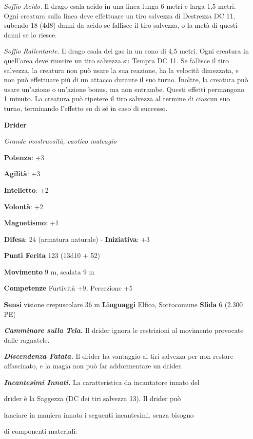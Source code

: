 \begin{multicols}{2}
\emph{Soffio Acido.} Il drago esala acido in una linea lunga 6 metri e
larga 1,5 metri. Ogni creatura sulla linea deve effettuare un tiro
salvezza di Destrezza DC 11, subendo 18 (4d8) danni da acido se fallisce
il tiro salvezza, o la metà di questi danni se lo riesce.

\emph{Soffio Rallentante.} Il drago esala del gas in un cono di 4,5
metri. Ogni creatura in quell'area deve riuscire un tiro salvezza su Tempra DC 11. Se fallisce il tiro salvezza, la creatura non può
usare la sua reazione, ha la velocità dimezzata, e non può effettuare
più di un attacco durante il suo turno. Inoltre, la creatura può usare
un'azione o un'azione bonus, ma non entrambe. Questi effetti permangono
1 minuto. La creatura può ripetere il tiro salvezza al termine di
ciascun suo turno, terminando l'effetto su di sé in caso di successo.



\textbf{Drider}

\emph{Grande mostruosità, caotico malvagio}

\textbf{Potenza}: +3

\textbf{Agilità}: +3

\textbf{Intelletto}: +2

\textbf{Volontà}: +2

\textbf{Magnetismo}: +1

\textbf{Difesa}: 24 (armatura naturale) - \textbf{Iniziativa}: +3

\textbf{Punti Ferita} 123 (13d10 + 52)

\textbf{Movimento} 9 m, scalata 9 m

\textbf{Competenze} Furtività +9, Percezione +5

\textbf{Sensi} visione crepuscolare 36 m
\textbf{Linguaggi} Elfico, Sottocomune \textbf{Sfida} 6 (2.300 PE)\smallskip

\emph{\textbf{Camminare sulla Tela.}} Il drider ignora le restrizioni al
movimento provocate dalle ragnatele.

\emph{\textbf{Discendenza Fatata.}} Il drider ha vantaggio ai tiri
salvezza per non restare affascinato, e la magia non può far
addormentare un drider.

\emph{\textbf{Incantesimi Innati.}} La caratteristica da incantatore
innato del

drider è la Saggezza (DC dei tiri salvezza 13). Il drider può

lanciare in maniera innata i seguenti incantesimi, senza bisogno

di componenti materiali:


\end{multicols}

